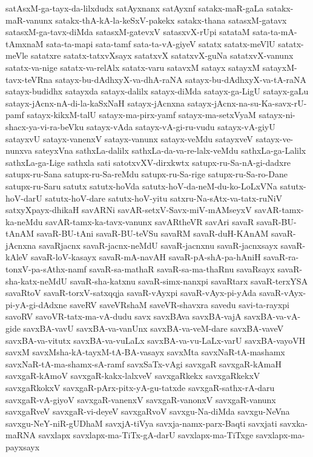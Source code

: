 {satAsxM-ga-tayx-da-lilxdudx
satAyxnanx
satAyxnf
satakx-maR-gaLa
satakx-maR-vanunx
satakx-thA-kA-la-keSxV-pakekx
satakx-thana
satasxM-gatavx
satasxM-ga-tavx-diMda
satasxM-gatevxV
satasxvX-rUpi
satataM
sata-ta-mA-tAmxnaM
sata-ta-mapi
sata-tamf
sata-ta-vA-giyeV
satatx
satatx-meVlU
satatx-meVle
satatxre
satatx-tatxvXsayx
satatxvX
satatxvX-guNa
satatxvX-vanunx
satatx-va-nige
satatx-va-relAlx
satatx-varu
satavxM
satayx
satayxM
satayxM-tavx-teVRna
satayx-bu-dAdhxyX-va-dhA-raNA
satayx-bu-dAdhxyX-va-tA-raNA
satayx-budidhx
satayxda
satayx-dalilx
satayx-diMda
satayx-ga-LigU
satayx-gaLu
satayx-jAcnx-nA-di-la-kaSxNaH
satayx-jAcnxna
satayx-jAcnx-na-su-Ka-savx-rU-pamf
satayx-kikxM-talU
satayx-ma-pirx-yamf
satayx-ma-setxVyaM
satayx-ni-shacx-ya-vi-ra-beVku
satayx-vAda
satayx-vA-gi-ru-vudu
satayx-vA-giyU
satayxvU
satayx-vanenxV
satayx-vanunx
satayx-veMdu
satayxveV
satayx-ve-nunxva
sateyxVna
sathxLa-dalilx
sathxLa-da-va-re-lalx-veMdu
sathxLa-ga-Lalilx
sathxLa-ga-Lige
sathxla
sati
satotxvXV-dirxkwtx
satupx-ru-Sa-nA-gi-dadxre
satupx-ru-Sana
satupx-ru-Sa-reMdu
satupx-ru-Sa-rige
satupx-ru-Sa-ro-Dane
satupx-ru-Saru
satutx
satutx-hoVda
satutx-hoV-da-neM-du-ko-LoLxVNa
satutx-hoV-darU
satutx-hoV-dare
satutx-hoV-yitu
satxru-Na-sAtx-va-tatx-ruNiV
satxyXpayx-dhikaH
savARNi
savAR-setxV-Savx-miV-mAMseyxV
savAR-tamx-ka-neMdu
savAR-tamx-ka-tavx-vanunx
savARtheVR
savAri
savaR
savaR-BU-tAnAM
savaR-BU-tAni
savaR-BU-teVSu
savaRM
savaR-duH-KAnAM
savaR-jAcnxna
savaRjacnx
savaR-jacnx-neMdU
savaR-jacnxnu
savaR-jacnxsayx
savaR-kAleV
savaR-loV-kasayx
savaR-mA-navAH
savaR-pA-shA-pa-hAniH
savaR-ra-tonxV-pa-sAthx-namf
savaR-sa-mathaR
savaR-sa-ma-thaRnu
savaRsayx
savaR-sha-katx-neMdU
savaR-sha-katxnu
savaR-simx-nanxpi
savaRtarx
savaR-terxYSA
savaRtoV
savaR-torxV-satxqqja
savaR-vAyxpi
savaR-vAyx-pi-yAda
savaR-vAyx-pi-yA-gi-dAdxne
saveRV
saveVRshaM
saveVR-shavxra
savedu
savi-ta-rayxpi
savoRV
savoVR-tatx-ma-vA-dudu
savx
savxBAva
savxBA-vajA
savxBA-va-vA-gide
savxBA-vavU
savxBA-va-vanUnx
savxBA-va-veM-dare
savxBA-vaveV
savxBA-va-vitutx
savxBA-va-vuLaLx
savxBA-va-vu-LaLx-varU
savxBA-vayoVH
savxM
savxMsha-kA-tayxM-tA-BA-vasayx
savxMta
savxNaR-tA-mashamx
savxNaR-tA-ma-shamx-sA-ramf
savxSaTx-vAgi
savxgaR
savxgaR-kAmaH
savxgaR-kAmoV
savxgaR-kakx-lalxveV
savxgaRkekx
savxgaRkekxV
savxgaRkokxV
savxgaR-pArx-pitx-yA-gu-tatxde
savxgaR-sathx-rA-daru
savxgaR-vA-giyoV
savxgaR-vanenxV
savxgaR-vanonxV
savxgaR-vanunx
savxgaRveV
savxgaR-vi-deyeV
savxgaRvoV
savxgu-Na-diMda
savxgu-NeVna
savxgu-NeY-niR-gUDhaM
savxjA-tiVya
savxja-namx-parx-Baqti
savxjati
savxka-maRNA
savxlapx
savxlapx-ma-TiTx-gA-darU
savxlapx-ma-TiTxge
savxlapx-ma-payxsayx
}
